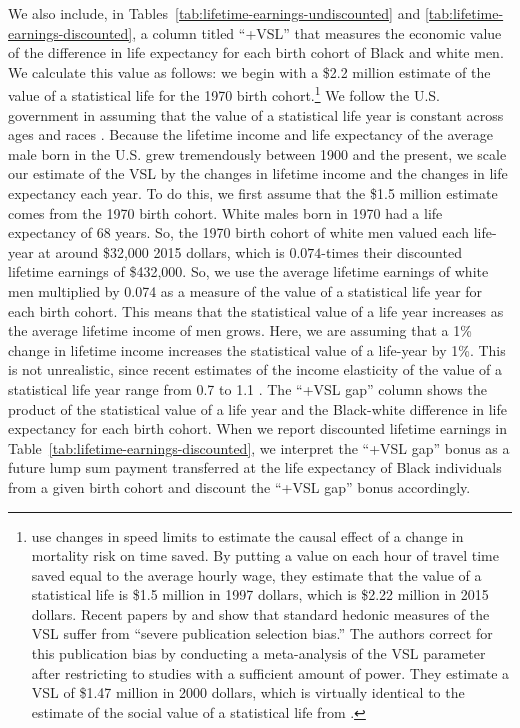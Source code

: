 \documentclass[12pt]{article}
\begin{document}
We also include, in Tables~\ref{tab:lifetime-earnings-undiscounted} and \ref{tab:lifetime-earnings-discounted}, a column titled ``+VSL'' that measures the economic value of the difference in life expectancy for each birth cohort of Black and white men. 
We calculate this value as follows: we begin with a \$2.2 million estimate of the value of a statistical life for the 1970 birth cohort.\footnote{ use changes in speed limits to estimate the causal effect of a change in mortality risk on time saved. 
By putting a value on each hour of travel time saved equal to the average hourly wage, they estimate that the value of a statistical life is \$1.5 million in 1997 dollars, which is \$2.22 million in 2015 dollars. 
Recent papers by  and  show that standard hedonic measures of the VSL suffer from ``severe publication selection bias.'' 
The authors correct for this publication bias by conducting a meta-analysis of the VSL parameter after restricting to studies with a sufficient amount of power. 
They estimate a VSL of \$1.47 million in 2000 dollars, which is virtually identical to the estimate of the social value of a statistical life from .} 
We follow the U.S. government in assuming that the value of a statistical life year is constant across ages and races . 
Because the lifetime income and life expectancy of the average male born in the U.S. grew tremendously between 1900 and the present, we scale our estimate of the VSL by the changes in lifetime income and the changes in life expectancy each year. 
To do this, we first assume that the \$1.5 million estimate comes from the 1970 birth cohort. White males born in 1970 had a life expectancy of 68 years. 
So, the 1970 birth cohort of white men valued each life-year at around \$32,000 2015 dollars, which is $0.074$-times their discounted lifetime earnings of \$432,000. 
So, we use the average lifetime earnings of white men multiplied by 0.074 as a measure of the value of a statistical life year for each birth cohort. 
This means that the statistical value of a life year increases as the average lifetime income of men grows. 
Here, we are assuming that a 1\% change in lifetime income increases the statistical value of a life-year by 1\%. 
This is not unrealistic, since recent estimates of the income elasticity of the value of a statistical life year range from 0.7 to 1.1 . 
The ``+VSL gap'' column shows the product of the statistical value of a life year and the Black-white difference in life expectancy for each birth cohort. 
When we report discounted lifetime earnings in Table~\ref{tab:lifetime-earnings-discounted}, we interpret the ``+VSL gap'' bonus as a future lump sum payment transferred at the life expectancy of Black individuals from a given birth cohort and discount the ``+VSL gap'' bonus accordingly.
\end{document}
